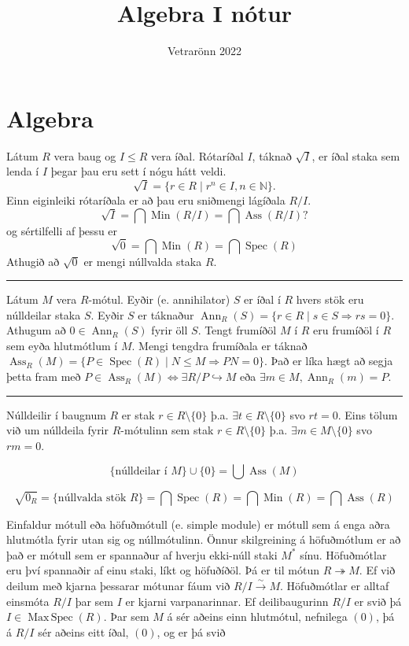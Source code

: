 \documentclass[a4paper, 14pt]{article}
\title{Algebra I nótur}
\date{Vetrarönn 2022}
\DeclareMathOperator{\Spec}{Spec}
\DeclareMathOperator{\Ann}{Ann}
\DeclareMathOperator{\Ass}{Ass}
\DeclareMathOperator{\Min}{Min}
\DeclareMathOperator{\MaxSpec}{Max\, Spec}
\let\surfun\twoheadrightarrow
\let\infun\hookrightarrow
\newcommand{\ru}{\noindent\rule{\textwidth}{0.4pt}}
\newcommand{\N}{\mathbb{N}}
\newcommand{\then}{\Longrightarrow}
\begin{document}
\maketitle


\section{Algebra}

Látum $R$ vera baug og $I \leq R$ vera íðal. Rótaríðal $I$, táknað $\sqrt{I}$, er íðal staka sem lenda í $I$ þegar þau eru sett í nógu hátt veldi.
$$
    \sqrt{I} = \{ r \in R \mid r^n \in I, n \in \N \}.
$$
Einn eiginleiki rótaríðala er að þau eru sniðmengi lágíðala $R/I$.
\[
    \sqrt{I} = \bigcap \Min(R/I) = \bigcap \Ass(R/I) ?
\]
og sértilfelli af þessu er
\[
    \sqrt{0} = \bigcap \Min(R) = \bigcap \Spec(R)
\]
Athugið að $\sqrt{0}$ er mengi núllvalda staka $R$.

\ru

Látum $M$ vera $R$-mótul. Eyðir (e. annihilator) $S$ er íðal í $R$ hvers stök eru núlldeilar staka $S$. Eyðir $S$ er táknaður $\Ann_R(S) = \{ r \in R \mid s \in S \then rs = 0 \}$. Athugum að $0 \in \Ann_R(S)$ fyrir öll $S$. Tengt frumíðöl $M$ í $R$ eru frumíðöl í $R$ sem 
eyða hlutmótlum í $M$. Mengi tengdra frumíðala er táknað $\Ass_R(M) = \{ P \in \Spec(R) \mid N \leq M \then PN = 0 \}.$
Það er líka hægt að segja þetta fram með 
$P \in \Ass_R(M) \iff \exists R/P \infun M$ eða $\exists m \in M, \Ann_R(m) = P$.

\ru

Núlldeilir í baugnum $R$ er stak $r \in R \setminus \{ 0 \} $ þ.a. $\exists t \in R \setminus \{ 0 \}$ svo $rt = 0$.
Eins tölum við um núlldeila fyrir $R$-mótulinn sem stak $r \in R \setminus \{ 0 \} $ þ.a. $\exists m \in M \setminus \{ 0 \}$ svo $rm = 0$.

$$
    \{ \text{núlldeilar í } M \} \cup \{ 0 \} = \bigcup \Ass(M)
$$

$$
    \sqrt{0_R} = \{ \text{núllvalda stök } R \} = \bigcap \Spec(R) = \bigcap \Min(R) = \bigcap \Ass(R)
$$

Einfaldur mótull eða höfuðmótull (e. simple module) er mótull sem á enga aðra hlutmótla fyrir utan sig og núllmótulinn.
Önnur skilgreining á höfuðmótlum er að það er mótull  sem er spannaður af hverju ekki-núll staki $M^*$ sínu.
Höfuðmótlar eru því spannaðir af einu staki, líkt og höfuðíðöl.
Þá er til mótun $R \surfun M$. Ef við
deilum með kjarna þessarar mótunar fáum við $R/I \xrightarrow{\sim} M$. Höfuðmótlar er alltaf einsmóta $R/I$ þar sem $I$ er kjarni varpanarinnar. Ef deilibaugurinn $R/I$ er svið þá $I \in \MaxSpec(R)$. Þar sem $M$ á sér aðeins einn
hlutmótul, nefnilega $(0)$, þá á $R/I$ sér aðeins eitt íðal, $(0)$, og er þá svið
\end{document}
